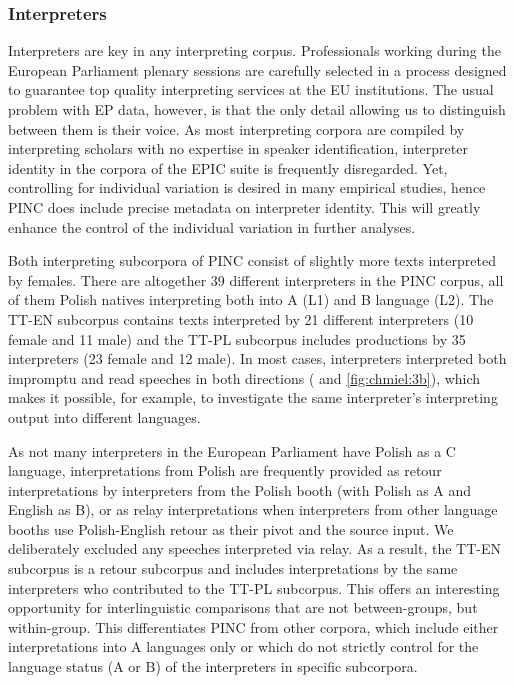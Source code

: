 \documentclass[output=paper]{langscibook}
\begin{document}
 \subsubsection{Interpreters}\label{sec:chmiel:2.1.4}
 

Interpreters are key in any interpreting corpus. Professionals working during the European Parliament plenary sessions are carefully selected in a process designed to guarantee top quality interpreting services at the EU institutions. The usual problem with EP data, however, is that the only detail allowing us to distinguish between them is their voice. As most interpreting corpora are compiled by interpreting scholars with no expertise in speaker identification, interpreter identity in the corpora of the EPIC suite is frequently disregarded. Yet, controlling for individual variation is desired in many empirical studies, hence PINC does include precise metadata on interpreter identity. This will greatly enhance the control of the individual variation in further analyses.

Both interpreting subcorpora of PINC consist of slightly more texts interpreted by females. There are altogether 39 different interpreters in the PINC corpus, all of them Polish natives interpreting both into A (L1) and B language (L2). The TT-EN subcorpus contains texts interpreted by 21 different interpreters (10 female and 11 male) and the TT-PL subcorpus includes productions by 35 interpreters (23 female and 12 male). In most cases, interpreters interpreted both impromptu and read speeches in both directions ( and \ref{fig:chmiel:3b}), which makes it possible, for example, to investigate the same interpreter’s interpreting output into different languages.

As not many interpreters in the European Parliament have Polish as a C language, interpretations from Polish are frequently provided as retour interpretations by interpreters from the Polish booth (with Polish as A and English as B), or as relay interpretations when interpreters from other language booths use Polish-English retour as their pivot and the source input. We deliberately excluded any speeches interpreted via relay. As a result, the TT-EN subcorpus is a retour subcorpus and includes interpretations by the same interpreters who contributed to the TT-PL subcorpus. This offers an interesting opportunity for interlinguistic comparisons that are not between-groups, but within-group. This differentiates PINC from other corpora, which include either interpretations into A languages only or which do not strictly control for the language status (A or B) of the interpreters in specific subcorpora.
\end{document}

